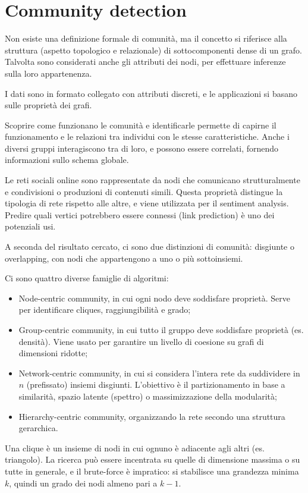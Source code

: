 \section{Community detection}
Non esiste una definizione formale di comunità, ma il concetto si riferisce alla struttura (aspetto topologico e relazionale) di sottocomponenti dense di un grafo. Talvolta sono considerati anche gli attributi dei nodi, per effettuare inferenze sulla loro appartenenza.

I dati sono in formato collegato con attributi discreti, e le applicazioni si basano sulle proprietà dei grafi.

Scoprire come funzionano le comunità e identificarle permette di capirne il funzionamento e le relazioni tra individui con le stesse caratteristiche. Anche i diversi gruppi interagiscono tra di loro, e possono essere correlati, fornendo informazioni sullo schema globale.

Le reti sociali online sono rappresentate da nodi che comunicano 
strutturalmente e condivisioni o produzioni di contenuti simili. Questa 
proprietà distingue la tipologia di rete rispetto alle altre, e viene utilizzata 
per il sentiment analysis. Predire quali vertici potrebbero essere connessi 
(link prediction) è uno dei potenziali usi.

A seconda del risultato cercato, ci sono due distinzioni di comunità: disgiunte o overlapping, con nodi che appartengono a uno o più sottoinsiemi.

Ci sono quattro diverse famiglie di algoritmi:
\begin{itemize}
	\item Node-centric community, in cui ogni nodo deve soddisfare proprietà. Serve per identificare cliques, raggiungibilità e grado;
	\item Group-centric community, in cui tutto il gruppo deve soddisfare proprietà (es. densità). Viene usato per garantire un livello di coesione su grafi di dimensioni ridotte;
	\item Network-centric community, in cui si considera l'intera rete da suddividere in $n$ (prefissato) insiemi disgiunti. L'obiettivo è il partizionamento in base a similarità, spazio latente (spettro) o massimizzazione della modularità;
	\item Hierarchy-centric community, organizzando la rete secondo una struttura gerarchica.
\end{itemize}
Una clique è un insieme di nodi in cui ognuno è adiacente agli altri (es. triangolo). La ricerca può essere incentrata su quelle di dimensione massima o su tutte in generale, e il brute-force è impratico: si stabilisce una grandezza minima $k$, quindi un grado dei nodi almeno pari a $k - 1$. 


